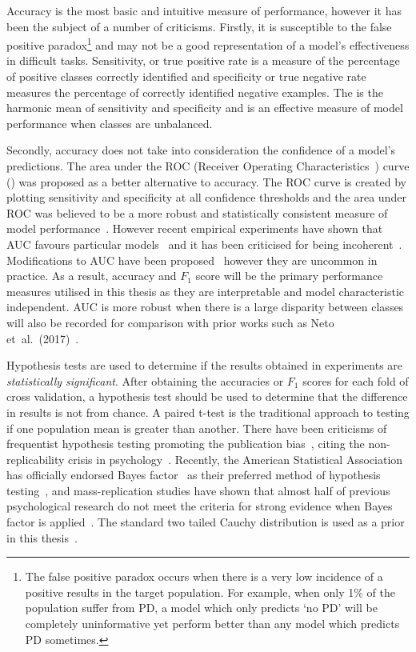\documentclass[12pt, twoside]{book}
\renewcommand\emph[1]{\textit{\color{USred}{#1}}}
\begin{document}
Accuracy is the most basic and intuitive measure of performance, however it has been the subject of a number of criticisms. Firstly, it is susceptible to the false positive paradox\footnote{The false positive paradox occurs when there is a very low incidence of a positive results in the target population. For example, when only 1\% of the population suffer from PD, a model which only predicts `no PD' will be completely uninformative yet perform better than any model which predicts PD sometimes.} and may not be a good representation of a model's effectiveness in difficult tasks. Sensitivity, or true positive rate is a measure of the percentage of positive classes correctly identified and specificity or true negative rate measures the percentage of correctly identified negative examples. The \emph{$F_1$ score} is the harmonic mean of sensitivity and specificity and is an effective measure of model performance when classes are unbalanced. 

Secondly, accuracy does not take into consideration the confidence of a model's predictions. The area under the ROC (Receiver Operating Characteristics~\cite{rocauc}) curve (\emph{AUC}) was proposed as a better alternative to accuracy. The ROC curve is created by plotting sensitivity and specificity at all confidence thresholds and the area under ROC was believed to be a more robust and statistically consistent measure of model performance~\cite{aucgood}. However recent empirical experiments have shown that AUC favours particular models~\cite{aucmislead2} and it has been criticised for being incoherent~\cite{aucmislead, aucincoherent}. Modifications to AUC have been proposed~\cite{aucmislead2, aucincoherent} however they are uncommon in practice. As a result, accuracy and $F_1$ score will be the primary performance measures utilised in this thesis as they are interpretable and model characteristic independent. AUC is more robust when there is a large disparity between classes will also be recorded for comparison with prior works such as Neto et~al.~(2017)~\cite{mpowerneto2017analysis}.


Hypothesis tests are used to determine if the results obtained in experiments are \textit{statistically significant}. After obtaining the accuracies or $F_1$ scores for each fold of cross validation, a hypothesis test should be used to determine that the difference in results is not from chance. A paired t-test is the traditional approach to testing if one population mean is greater than another. There have been criticisms of frequentist hypothesis testing promoting the publication bias~\cite{publicationbias}, citing the non-replicability crisis in psychology~\cite{replicability}. Recently, the American Statistical Association has officially endorsed Bayes factor~\cite{bayesianttests} as their preferred method of hypothesis testing~\cite{bayesfactorASA}, and mass-replication studies have shown that almost half of previous psychological research do not meet the criteria for strong evidence when Bayes factor is applied~\cite{bayesfactorempirical}. The standard two tailed Cauchy distribution is used as a prior in this thesis~\cite{bayesianttests}.
\end{document}
